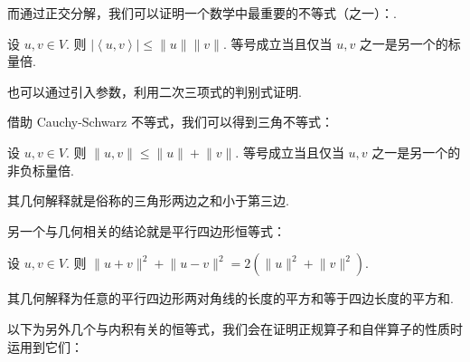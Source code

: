 而通过正交分解，我们可以证明一个数学中最重要的不等式（之一）：.

\begin{theorem}
    设 $u, v \in V$. 则 $\left\lvert \left\langle u, v\right\rangle \right\rvert \leqslant \lVert u \rVert\lVert v \rVert$. 等号成立当且仅当 $u, v$ 之一是另一个的标量倍.
\end{theorem}

也可以通过引入参数，利用二次三项式的判别式证明.

借助 Cauchy-Schwarz 不等式，我们可以得到三角不等式：

\begin{theorem}
    设 $u, v \in V$. 则 $\lVert u, v \rVert \leqslant \lVert u \rVert + \lVert v \rVert$. 等号成立当且仅当 $u, v$ 之一是另一个的非负标量倍.
\end{theorem}

其几何解释就是俗称的三角形两边之和小于第三边.

另一个与几何相关的结论就是平行四边形恒等式：

\begin{theorem}
    设 $u, v \in V$. 则 $ \lVert u + v \rVert^{2} + \lVert u - v \rVert^{2} = 2(\lVert u \rVert^{2} + \lVert v \rVert^{2})$.
\end{theorem}

其几何解释为任意的平行四边形两对角线的长度的平方和等于四边长度的平方和.

以下为另外几个与内积有关的恒等式，我们会在证明正规算子和自伴算子的性质时运用到它们：

